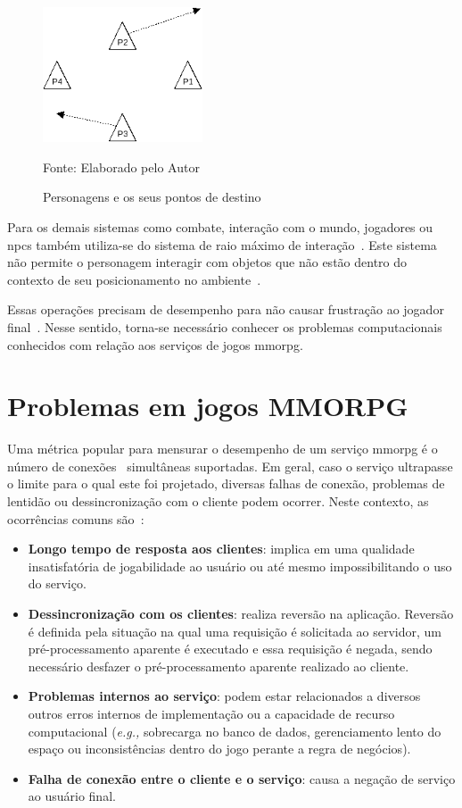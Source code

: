 \begin{figure}[htb!]
\caption{Personagens e os seus pontos de destino}
\label{fig:walk}
\includegraphics[height=4cm]{img/cap2/walk.png}
\centering

Fonte: Elaborado pelo Autor
\end{figure}



Para os demais sistemas como combate, interação com o mundo, jogadores ou \ac{npcs} também utiliza-se do sistema de raio máximo de interação~\cite{albion_online_unite}.
%
Este sistema não permite o personagem interagir com objetos que não estão dentro do contexto de seu posicionamento no ambiente~\cite{albion_online_unite}.


Essas operações precisam de desempenho para não causar frustração ao jogador final~\cite{7008965}.
%
Nesse sentido, torna-se necessário conhecer os problemas computacionais conhecidos com relação aos serviços de jogos \ac{mmorpg}.

\section{Problemas em jogos MMORPG}
\label{sec:problemas}

Uma métrica popular para mensurar o desempenho de um serviço \ac{mmorpg} é o número de conexões~\cite{1417630} simultâneas suportadas.
%
Em geral, caso o serviço ultrapasse o limite para o qual este foi projetado, diversas falhas de conexão, problemas de lentidão ou dessincronização com o cliente podem ocorrer.
%
Neste contexto, as ocorrências comuns são~\cite{1417630}:

\begin{itemize}
  \item \textbf{Longo tempo de resposta aos clientes}: implica em uma qualidade insatisfatória de jogabilidade ao usuário ou até mesmo impossibilitando o uso do serviço.
  \item \textbf{Dessincronização com os clientes}: realiza reversão na aplicação. Reversão é definida pela situação na qual uma requisição é solicitada ao servidor, um pré-processamento aparente é executado e essa requisição é negada, sendo necessário desfazer o pré-processamento aparente realizado ao cliente.
  \item \textbf{Problemas internos ao serviço}:  podem estar relacionados a diversos outros erros internos de implementação ou a capacidade de recurso computacional (\textit{e.g.,} sobrecarga no banco de dados, gerenciamento lento do espaço ou inconsistências dentro do jogo perante a regra de negócios).
  \item \textbf{Falha de conexão entre o cliente e o serviço}: causa a negação de serviço ao usuário final.
\end{itemize}

